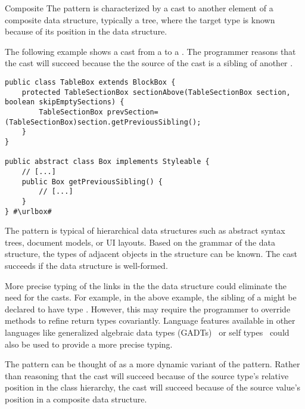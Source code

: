 \begin{pattern}{Composite}
The \thisp{} pattern is characterized by a cast to another element of a
composite data structure, typically a tree, where the target type is known because of its
position in the data structure.

\instances{}
The following example
shows a cast from a  to a .
The programmer reasons that the cast will succeed because the 
the source of the cast is a sibling of another .

\def\urlvar{http://bit.ly/flyingsaucerproject_flyingsaucer_2N2nYbY}
\begin{verbatim}
public class TableBox extends BlockBox {
    protected TableSectionBox sectionAbove(TableSectionBox section, boolean skipEmptySections) {
        TableSectionBox prevSection=(TableSectionBox)section.getPreviousSibling();
    }
}

public abstract class Box implements Styleable {
    // [...]
    public Box getPreviousSibling() {
        // [...]
    }
} #\urlbox#
\end{verbatim}

\discussion{}
The pattern is typical of hierarchical data structures such as abstract syntax
trees, document models, or UI layouts. Based on the grammar of 
the data structure, the types of adjacent objects in the structure can be known.
The cast succeeds if the data structure is well-formed.

More precise typing of the links in the the data structure could 
eliminate the need for the casts. For example, in the above example,
the sibling of a  might be declared to have type
. However, this may require the programmer to override
methods to refine return types covariantly.
Language features available in other languages like generalized algebraic data types
  (GADTs)~\cite{gadts} or self types~\cite{bruceChallengingTypingIssues2003,scalaIndependentlyExtensible} could also be 
used to provide a more precise typing.

The pattern can be thought of as a more dynamic variant of the
 pattern. Rather than
reasoning that the cast will succeed because of the source type's relative position in the 
class hierarchy, the cast will succeed because of the source value's position
in a composite data structure.

\end{pattern}
